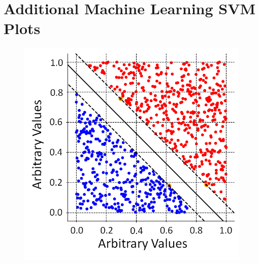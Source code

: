 \chapter{Additional Machine Learning SVM Plots} 

\begin{figure}[!h]
\centering
\begin{minipage}{.45\textwidth}
  \centering
  \includegraphics[width=\linewidth]{Chapter4/Figs/adjustedSvmPlots/adjusted_LinSepExample.png}
  \label{fig:LinSepExample}
  \vspace{0.478cm}
\end{minipage}%
\qquad
\begin{minipage}{.45\textwidth}
  \centering

\end{minipage}
\end{figure}
